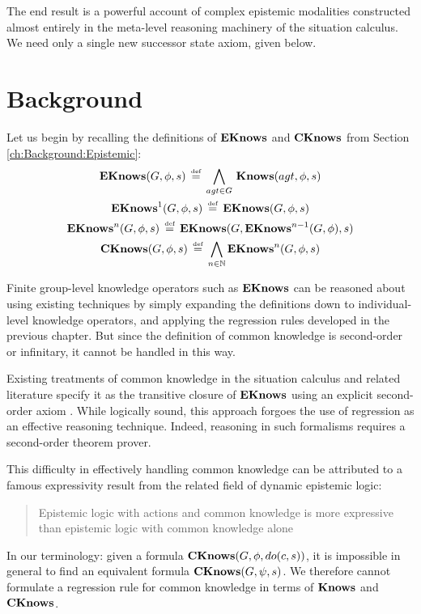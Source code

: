 The end result is a powerful account of complex epistemic modalities
constructed almost entirely in the meta-level reasoning machinery
of the situation calculus. We need only a single new successor state
axiom, given below.


\section{Background\label{sec:CKnowledgwBackground}}

Let us begin by recalling the definitions of $\mathbf{EKnows}$ and $\mathbf{CKnows}$
from Section \ref{ch:Background:Epistemic}:\begin{gather*}
\mathbf{EKnows}(G,\phi,s)\,\stackrel{\mbox{\tiny def}}{=}\,\bigwedge_{agt\in G}\,\mathbf{Knows}(agt,\phi,s)\\
\mathbf{EKnows}^{1}(G,\phi,s)\,\stackrel{\mbox{\tiny def}}{=}\,\mathbf{EKnows}(G,\phi,s)\\
\mathbf{EKnows}^{n}(G,\phi,s)\,\stackrel{\mbox{\tiny def}}{=}\,\mathbf{EKnows}(G,\mathbf{EKnows}^{n-1}(G,\phi),s)\\
\mathbf{CKnows}(G,\phi,s)\,\stackrel{\mbox{\tiny def}}{=}\,\bigwedge_{n\in\mathbb{N}}\mathbf{EKnows}^{n}(G,\phi,s)\end{gather*}


Finite group-level knowledge operators such as $\mathbf{EKnows}$ can be reasoned
about using existing techniques by simply expanding the definitions
down to individual-level knowledge operators, and applying the regression
rules developed in the previous chapter. But since the definition
of common knowledge is second-order or infinitary, it cannot be handled
in this way.

Existing treatments of common knowledge in the situation calculus
and related literature specify it as the transitive closure of $\mathbf{EKnows}$
using an explicit second-order axiom \citep{davis05fo_ma_theory,ghaderi07sc_joint_ability}.
While logically sound, this approach forgoes the use of regression
as an effective reasoning technique. Indeed, reasoning in such formalisms
requires a second-order theorem prover.

This difficulty in effectively handling common knowledge can be attributed
to a famous expressivity result from the related field of dynamic
epistemic logic:

\begin{quote}
Epistemic logic with actions and common knowledge is more expressive
than epistemic logic with common knowledge alone \citep{baltag98pa_ck} 
\end{quote}
In our terminology: given a formula $\mathbf{CKnows}(G,\phi,do(c,s))$, it
is impossible in general to find an equivalent formula $\mathbf{CKnows}(G,\psi,s)$.
We therefore cannot formulate a regression rule for common knowledge
in terms of $\mathbf{Knows}$ and $\mathbf{CKnows}$.

